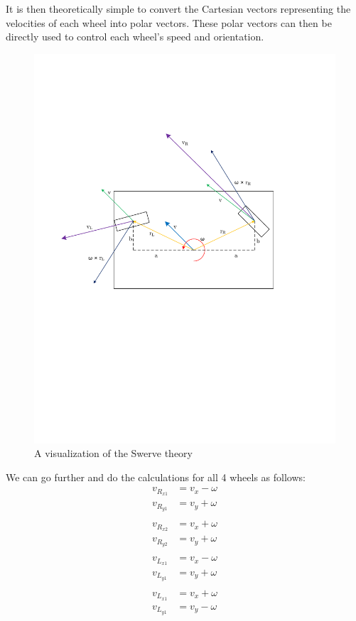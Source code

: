 \documentclass[a4paper]{article}
\begin{document}
It is then theoretically simple to convert the Cartesian vectors representing the velocities of each wheel into polar vectors. These polar vectors can then be directly used to control each wheel's speed and orientation. 

\begin{figure}[h]%
\begin{center}
\includegraphics[scale=0.9]{Diagrams/SwerveMath.pdf}
\end{center}
\caption{A visualization of the Swerve theory}%
\label{SwerveMath1}%
\end{figure}

We can go further and do the calculations for all 4 wheels as follows:
\begin{align*}	v_{R_{x1}}	&= v_{x}-\omega  \\
								v_{R_{y1}}	&= v_{y}+\omega  \\
								&\\
								v_{R_{x2}}	&= v_{x}+\omega  \\
								v_{R_{y2}}	&= v_{y}+\omega  \\
								&\\
								v_{L_{x1}}	&= v_{x}-\omega  \\
								v_{L_{y1}}	&= v_{y}+\omega  \\
								&\\
								v_{L_{x1}}	&= v_{x}+\omega  \\
								v_{L_{y1}}	&= v_{y}-\omega  \\ \end{align*}
								
\end{document}
